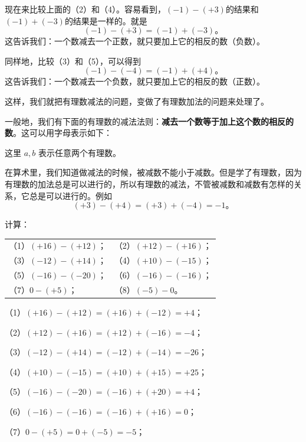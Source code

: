 现在来比较上面的（2）和（4）。容易看到，\((-1)-(+3)\)的结果和\((-1)+(-3)\)的结果是一样的。就是
\[
(-1) - (+3) = (-1) + (-3)。
\]
这告诉我们：一个数减去一个正数，就只要加上它的相反的数（负数）。

同样地，比较（3）和（5），可以得到
\[
(-1) - (-4) = (-1) + (+4)。
\]
这告诉我们：一个数减去一个负数，就只要加上它的相反的数（正数）。

这样，我们就把有理数减法的问题，变做了有理数加法的问题来处理了。

一般地，我们有下面的有理数的减法法则：\textbf{减去一个数等于加上这个数的相反的数}。这可以用字母表示如下：

\begin{center}
\end{center}

这里 $a, b$ 表示任意两个有理数。

 在算术里，我们知道做减法的时候，被减数不能小于减数。但是学了有理数，因为有理数的加法总是可以进行的，所以有理数的减法，不管被减数和减数有怎样的关系，它总是可以进行的。例如
\[
(+3) - (+4) = (+3) + (-4) = -1。
\]

 计算：
\par\smallskip
\begin{tabular}{@{}ll@{}}
（1）\((+16) - (+12)\)； & （2）\((+12) - (+16)\)； \\[4pt]
（3）\((-12) - (+14)\)； & （4）\((+10) - (-15)\)； \\[4pt]
（5）\((-16) - (-20)\)； & （6）\((-16) - (-16)\)； \\[4pt]
（7）\(0 - (+5)\)； & （8）\((-5) - 0\)。
\end{tabular}

 （1）\((+16) - (+12) = (+16) + (-12) = +4\)；

（2）\((+12) - (+16) = (+12) + (-16) = -4\)；

（3）\((-12) - (+14) = (-12) + (-14) = -26\)；

（4）\((+10) - (-15) = (+10) + (+15) = +25\)；

（5）\((-16) - (-20) = (-16) + (+20) = +4\)；

（6）\((-16) - (-16) = (-16) + (+16) = 0\)；

（7）\(0 - (+5) = 0 + (-5) = -5\)；


